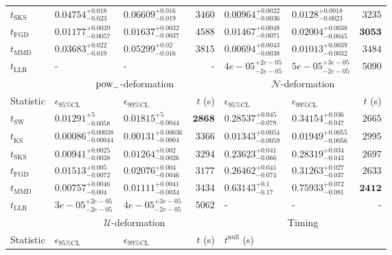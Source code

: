 \begin{tabular}{l|llr|llr}
	$t_{\mathrm{SKS}}$ & $0.04754_{-0.023}^{+0.018}$ & $0.06609_{-0.019}^{+0.016}$ & $3460$ & $0.00964_{-0.0036}^{+0.0022}$ & $0.0128_{-0.0023}^{+0.0018}$ & $3235$ \\
	$t_{\mathrm{FGD}}$ & ${\mathbf{0.01177_{-0.0057}^{+0.0039}}}$ & ${\mathbf{0.01637_{-0.0037}^{+0.0032}}}$ & $4588$ & $0.01467_{-0.0071}^{+0.0048}$ & $0.02004_{-0.0045}^{+0.0038}$ & ${\mathbf{3053}}$ \\
	$t_{\mathrm{MMD}}$ & $0.03683_{-0.019}^{+0.022}$ & $0.05299_{-0.016}^{+0.02}$ & $3815$ & $0.00694_{-0.0038}^{+0.0043}$ & $0.01013_{-0.0032}^{+0.0039}$ & $3484$ \\
	$t_{\mathrm{LLR}}$ & - & - & - & $4e-05_{-2e-05}^{+2e-05}$ & $5e-05_{-2e-05}^{+3e-05}$ & $5090$ \\
	\toprule
	\multicolumn{1}{c}{} & \multicolumn{3}{c}{$\rm{pow}_{-}$-deformation} & \multicolumn{3}{c}{$\mathcal{N}$-deformation} \\
	Statistic & $\epsilon_{95\%\mathrm{CL}}$ & $\epsilon_{99\%\mathrm{CL}}$ & $t$ (s) & $\epsilon_{95\%\mathrm{CL}}$ & $\epsilon_{99\%\mathrm{CL}}$ & $t$ (s) \\
	\midrule
	$t_{\mathrm{SW}}$ & $0.01291_{-0.0058}^{+5}$ & $0.01815_{-0.0044}^{+5}$ & ${\mathbf{2868}}$ & $0.28537_{-0.078}^{+0.045}$ & $0.34154_{-0.047}^{+0.036}$ & $2665$ \\
	$t_{\overline{\mathrm{KS}}}$ & ${\mathbf{0.00086_{-0.00044}^{+0.00038}}}$ & ${\mathbf{0.00131_{-0.0004}^{+0.00036}}}$ & $3366$ & ${\mathbf{0.01343_{-0.0059}^{+0.0054}}}$ & ${\mathbf{0.01949_{-0.0056}^{+0.0055}}}$ & $2995$ \\
	$t_{\mathrm{SKS}}$ & $0.00941_{-0.0038}^{+0.0025}$ & $0.01264_{-0.0026}^{+0.002}$ & $3294$ & $0.23623_{-0.066}^{+0.041}$ & $0.28319_{-0.043}^{+0.034}$ & $2697$ \\
	$t_{\mathrm{FGD}}$ & $0.01513_{-0.0072}^{+0.005}$ & $0.02076_{-0.0046}^{+0.004}$ & $3177$ & $0.26462_{-0.074}^{+0.041}$ & $0.31263_{-0.037}^{+0.027}$ & $2633$ \\
	$t_{\mathrm{MMD}}$ & $0.00757_{-0.004}^{+0.0046}$ & $0.01111_{-0.0034}^{+0.0041}$ & $3434$ & $0.63143_{-0.17}^{+0.1}$ & $0.75933_{-0.081}^{+0.072}$ & ${\mathbf{2412}}$ \\
	$t_{\mathrm{LLR}}$ & $3e-05_{-2e-05}^{+2e-05}$ & $4e-05_{-2e-05}^{+3e-05}$ & $5062$ & - & - & - \\
	\toprule
	\multicolumn{1}{c}{} & \multicolumn{3}{c}{$\mathcal{U}$-deformation} & \multicolumn{3}{c}{Timing} \\
	Statistic & $\epsilon_{95\%\mathrm{CL}}$ & $\epsilon_{99\%\mathrm{CL}}$ & $t$ (s) & $t^{\mathrm{null}}$ (s) \\

\end{tabular}
